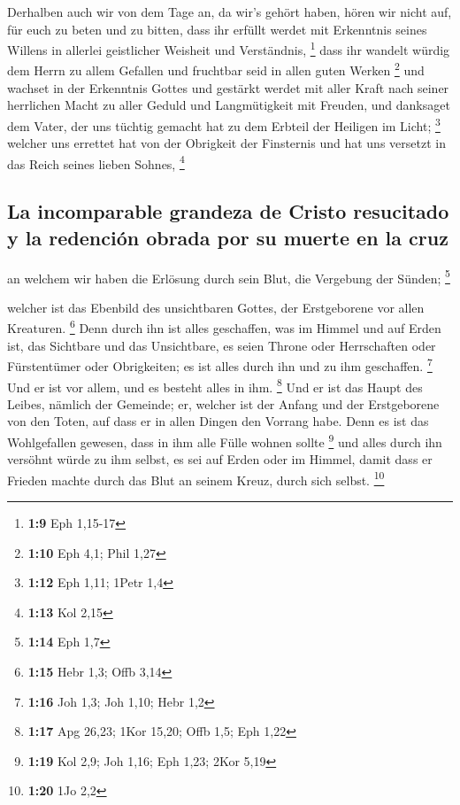  Derhalben auch wir von dem Tage an, da wir's gehört
haben, hören wir nicht auf, für euch zu beten und zu bitten, dass ihr
erfüllt werdet mit Erkenntnis seines Willens in allerlei geistlicher
Weisheit und Verständnis, \footnote{\textbf{1:9} Eph 1,15-17}
 dass ihr wandelt würdig dem Herrn zu allem Gefallen und
fruchtbar seid in allen guten Werken \footnote{\textbf{1:10} Eph 4,1;
  Phil 1,27}  und wachset in der Erkenntnis Gottes und
gestärkt werdet mit aller Kraft nach seiner herrlichen Macht zu aller
Geduld und Langmütigkeit mit Freuden,  und danksaget dem
Vater, der uns tüchtig gemacht hat zu dem Erbteil der Heiligen im Licht;
\footnote{\textbf{1:12} Eph 1,11; 1Petr 1,4}  welcher uns
errettet hat von der Obrigkeit der Finsternis und hat uns versetzt in
das Reich seines lieben Sohnes, \footnote{\textbf{1:13} Kol 2,15}

\hypertarget{la-incomparable-grandeza-de-cristo-resucitado-y-la-redenciuxf3n-obrada-por-su-muerte-en-la-cruz}{%
\subsection{La incomparable grandeza de Cristo resucitado y la redención
obrada por su muerte en la
cruz}\label{la-incomparable-grandeza-de-cristo-resucitado-y-la-redenciuxf3n-obrada-por-su-muerte-en-la-cruz}}

 an welchem wir haben die Erlösung durch sein Blut, die
Vergebung der Sünden; \footnote{\textbf{1:14} Eph 1,7}

 welcher ist das Ebenbild des unsichtbaren Gottes, der
Erstgeborene vor allen Kreaturen. \footnote{\textbf{1:15} Hebr 1,3; Offb
  3,14}  Denn durch ihn ist alles geschaffen, was im
Himmel und auf Erden ist, das Sichtbare und das Unsichtbare, es seien
Throne oder Herrschaften oder Fürstentümer oder Obrigkeiten; es ist
alles durch ihn und zu ihm geschaffen. \footnote{\textbf{1:16} Joh 1,3;
  Joh 1,10; Hebr 1,2}  Und er ist vor allem, und es
besteht alles in ihm. \footnote{\textbf{1:17} Apg 26,23; 1Kor 15,20;
  Offb 1,5; Eph 1,22}  Und er ist das Haupt des Leibes,
nämlich der Gemeinde; er, welcher ist der Anfang und der Erstgeborene
von den Toten, auf dass er in allen Dingen den Vorrang habe.
 Denn es ist das Wohlgefallen gewesen, dass in ihm alle
Fülle wohnen sollte \footnote{\textbf{1:19} Kol 2,9; Joh 1,16; Eph 1,23;
  2Kor 5,19}  und alles durch ihn versöhnt würde zu ihm
selbst, es sei auf Erden oder im Himmel, damit dass er Frieden machte
durch das Blut an seinem Kreuz, durch sich selbst. \footnote{\textbf{1:20}
  1Jo 2,2}

